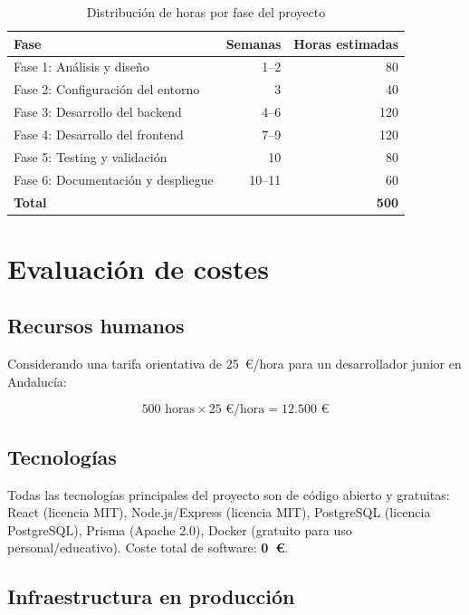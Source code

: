 \documentclass[a4paper]{report}
\begin{document}
\begin{table}[H]
  \centering
  \begin{tabular}{lrr}
    \toprule
    \textbf{Fase} & \textbf{Semanas} & \textbf{Horas estimadas} \\
    \midrule
    Fase 1: Análisis y diseño          & 1--2   & 80  \\
    Fase 2: Configuración del entorno  & 3      & 40  \\
    Fase 3: Desarrollo del backend     & 4--6   & 120 \\
    Fase 4: Desarrollo del frontend    & 7--9   & 120 \\
    Fase 5: Testing y validación       & 10     & 80  \\
    Fase 6: Documentación y despliegue & 10--11 & 60  \\
    \midrule
    \textbf{Total}                     &        & \textbf{500} \\
    \bottomrule
  \end{tabular}
  \caption{Distribución de horas por fase del proyecto}
\end{table}

\section{Evaluación de costes}

\subsection{Recursos humanos}

Considerando una tarifa orientativa de 25~€/hora para un desarrollador junior en Andalucía:

\[
  500\text{ horas} \times 25\text{ €/hora} = \mathbf{12.500\text{ €}}
\]

\subsection{Tecnologías}

Todas las tecnologías principales del proyecto son de código abierto y gratuitas: React (licencia MIT), Node.js/Express (licencia MIT), PostgreSQL (licencia PostgreSQL), Prisma (Apache 2.0), Docker (gratuito para uso personal/educativo). Coste total de software: \textbf{0~€}.

\subsection{Infraestructura en producción}
\end{document}

